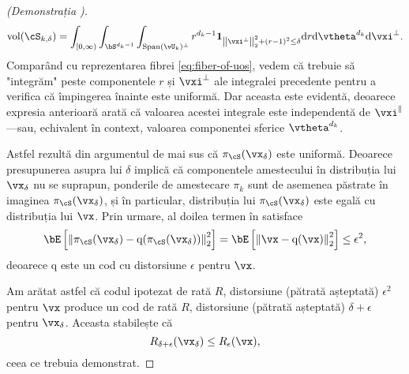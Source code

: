\documentclass[../../book-main_ro.tex]{subfiles}
\begin{document}
\begin{proof}[(Demonstrația )]
\begin{equation}
        \volume(\cS_{k, \delta})
        = \int_{[0, \infty)} \int_{\bS^{d_k-1}} \int_{\Span(\vU_k)^\perp} 
        r^{d_k-1}
        \mathbf{1}_{
            \norm*{\vxi^{\perp}}_2^2
            + \left( r - 1 \right)^2
            \leq
            \delta
        }
        \odif r \odif \vtheta^{d_k} \odif \vxi^{\perp}.
    \end{equation}
    Comparând cu reprezentarea fibrei \eqref{eq:fiber-of-uos},
    vedem că trebuie să "integrăm" peste componentele $r$ și $\vxi^\perp$
    ale integralei precedente pentru a verifica că împingerea înainte
    este uniformă.
    Dar aceasta este evidentă, deoarece expresia anterioară arată că valoarea acestei
    integrale este independentă de $\vxi^\|$---sau, echivalent în context,
    valoarea componentei sferice $\vtheta^{d_k}$.

    Astfel rezultă din argumentul de mai sus că $\pi_{\cS}(\vx_{\delta})$ este
    uniformă.
    Deoarece presupunerea asupra lui $\delta$ implică că componentele amestecului în
    distribuția lui $\vx_{\delta}$ nu se suprapun, ponderile de amestecare
    $\pi_k$ sunt de asemenea păstrate în imaginea $\pi_{\cS}(\vx_{\delta})$, și în
    particular, distribuția lui $\pi_{\cS}(\vx_{\delta})$ este egală cu
    distribuția lui $\vx$.
    Prin urmare, al doilea termen în  satisface
    \begin{equation}
        \bE\left[ \norm*{ \pi_{\cS}(\vx_{\delta}) - \mathrm{q}(\pi_{\cS}(\vx_{\delta})) }_2^2 \right]
        =
        \bE\left[ \norm*{ \vx - \mathrm{q}(\vx) }_2^2 \right]
        \leq
        \epsilon^2,
    \end{equation}
    deoarece $\mathrm{q}$ este un cod cu distorsiune $\epsilon$ pentru $\vx$.

    Am arătat astfel că codul ipotezat de rată $R$, distorsiune (pătrată așteptată)
    $\epsilon^2$ pentru $\vx$ produce un cod de rată $R$, distorsiune (pătrată
    așteptată) $\delta + \epsilon$ pentru $\vx_{\delta}$.
    Aceasta stabilește că
    \begin{equation}
        R_{\delta + \epsilon}(\vx_{\delta})
        \leq
        R_{\epsilon}(\vx),
    \end{equation}
    ceea ce trebuia demonstrat.


\end{proof}
\end{document}
